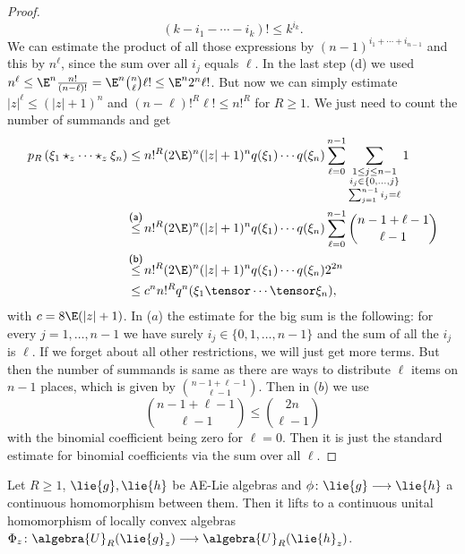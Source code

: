 \begin{proof}
\begin{equation*}
    		{(k - i_1 - \cdots - i_k)!}
    		\leq
    		k^{i_k}.
    \end{equation*}
    We can estimate the product of all those expressions by $(n-1)^{i_1 + 
    \cdots + i_{n-1}}$ and this by $n^\ell$, since the sum over all $i_j$ 
    equals $\ell$. In the last step (d) we used $n^{\ell} \leq \E^n
    \frac{n!}{(n-\ell)!} = \E^n \binom{n} {\ell} \ell! \leq \E^n 2^n
    \ell!$. But now we can simply estimate $|z|^{\ell} \leq (|z| +
    1)^n$ and $(n - \ell)!^R \ell! \leq n!^R$ for $R \geq 1$. We just
    need to count the number of summands and get
    \begin{align*}
        p_R \left(
            \xi_1 \star_z \cdots \star_z \xi_n
        \right)
        & \leq
        n!^R (2 \E)^n (|z| + 1)^n
        q(\xi_1) \cdots q(\xi_n)
        \sum\limits_{\ell = 0}^{n-1}
        \sum\limits_{\substack{
			1 \leq j \leq n-1 \\
			i_j \in \{0, \ldots, j\} \\
			\sum_{j = 1}^{n - 1} i_j = \ell
		}}
		1
        \\
        &\ot{(a)}{\leq}
        n!^R (2 \E)^n (|z| + 1)^n
        q(\xi_1) \cdots q(\xi_n)
        \sum\limits_{\ell = 0}^{n-1}
        \binom{n - 1 + \ell - 1}{\ell - 1}
        \\
        &\ot{(b)}{\leq}
        n!^R (2 \E)^n (|z| + 1)^n
        q(\xi_1) \cdots q(\xi_n)
        2^{2n}
        \\
        &\leq
        c^n n!^R q^n(\xi_1 \tensor \cdots \tensor \xi_n),
    \end{align*}
    with $c = 8 \E (|z| + 1)$. In ($a$) the estimate for the big sum
    is the following: for every $j = 1, \ldots, n-1$ we have surely
    $i_j \in \{0, 1, \ldots, n-1\}$ and the sum of all the $i_j$ is
    $\ell$. If we forget about all other restrictions, we will just get
    more terms. But then the number of summands is same as there
    are ways to distribute $\ell$ items on $n-1$ places, which is
    given by $\binom{n - 1 + \ell - 1}{\ell - 1}$. Then in ($b$) we
    use
    \begin{equation*}
        \binom{n - 1 + \ell - 1}{\ell - 1} \leq \binom{2 n}{\ell - 1}
    \end{equation*}
    with the binomial coefficient being zero for $\ell = 0$. Then it
    is just the standard estimate for binomial coefficients via the
    sum over all $\ell$.
\end{proof}
\begin{proposition}[Functoriality]
	\label{LCAna:Prop:Functoriality}
	Let $R \geq 1$, $\lie{g}, \lie{h}$ be AE-Lie algebras and $\phi \colon
	\lie{g} \longrightarrow \lie{h}$ a continuous homomorphism between them.
	Then it lifts to a continuous unital homomorphism of locally convex
	algebras $\Phi_z \colon \algebra{U}_R(\lie{g}_z) \longrightarrow
	\algebra{U}_R(\lie{h}_z)$.
\end{proposition}
